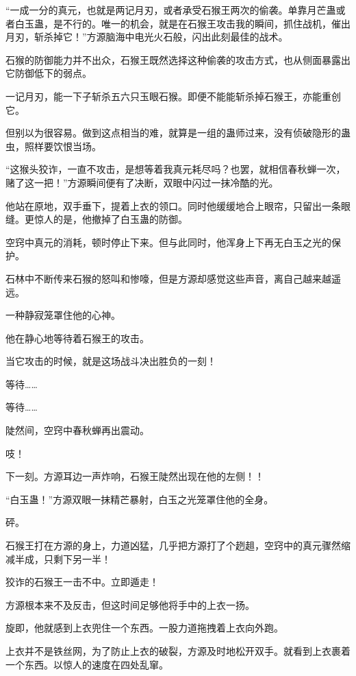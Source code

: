 
\begin{this_body}

“一成一分的真元，也就是两记月刃，或者承受石猴王两次的偷袭。单靠月芒蛊或者白玉蛊，是不行的。唯一的机会，就是在石猴王攻击我的瞬间，抓住战机，催出月刃，斩杀掉它！”方源脑海中电光火石般，闪出此刻最佳的战术。

石猴的防御能力并不出众，石猴王既然选择这种偷袭的攻击方式，也从侧面暴露出它防御低下的弱点。

一记月刃，能一下子斩杀五六只玉眼石猴。即便不能能斩杀掉石猴王，亦能重创它。

但别以为很容易。做到这点相当的难，就算是一组的蛊师过来，没有侦破隐形的蛊虫，照样要饮恨当场。

“这猴头狡诈，一直不攻击，是想等着我真元耗尽吗？也罢，就相信春秋蝉一次，赌了这一把！”方源瞬间便有了决断，双眼中闪过一抹冷酷的光。

他站在原地，双手垂下，提着上衣的领口。同时他缓缓地合上眼帘，只留出一条眼缝。更惊人的是，他撤掉了白玉蛊的防御。

空窍中真元的消耗，顿时停止下来。但与此同时，他浑身上下再无白玉之光的保护。

石林中不断传来石猴的怒叫和惨嚎，但是方源却感觉这些声音，离自己越来越遥远。

一种静寂笼罩住他的心神。

他在静心地等待着石猴王的攻击。

当它攻击的时候，就是这场战斗决出胜负的一刻！

等待……

等待……

陡然间，空窍中春秋蝉再出震动。

吱！

下一刻。方源耳边一声炸响，石猴王陡然出现在他的左侧！！

“白玉蛊！”方源双眼一抹精芒暴射，白玉之光笼罩住他的全身。

砰。

石猴王打在方源的身上，力道凶猛，几乎把方源打了个趔趄，空窍中的真元骤然缩减半成，只剩下另一半！

狡诈的石猴王一击不中。立即遁走！

方源根本来不及反击，但这时间足够他将手中的上衣一扬。

旋即，他就感到上衣兜住一个东西。一股力道拖拽着上衣向外跑。

上衣并不是铁丝网，为了防止上衣的破裂，方源及时地松开双手。就看到上衣裹着一个东西。以惊人的速度在四处乱窜。


\end{this_body}
